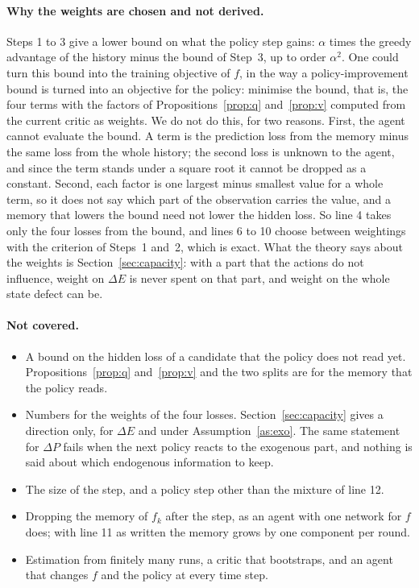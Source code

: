 \documentclass[11pt]{article}
\theoremstyle{definition}
\newcommand{\dE}{\Delta E}
\newcommand{\dP}{\Delta P}
\begin{document}
\paragraph{Why the weights are chosen and not derived.} Steps 1 to 3 give a lower bound on what the policy step gains: $\alpha$ times the greedy advantage of the history minus the bound of Step~3, up to order $\alpha^2$. One could turn this bound into the training objective of $f$, in the way a policy-improvement bound is turned into an objective for the policy: minimise the bound, that is, the four terms with the factors of Propositions~\ref{prop:q} and~\ref{prop:v} computed from the current critic as weights. We do not do this, for two reasons. First, the agent cannot evaluate the bound. A term is the prediction loss from the memory minus the same loss from the whole history; the second loss is unknown to the agent, and since the term stands under a square root it cannot be dropped as a constant. Second, each factor is one largest minus smallest value for a whole term, so it does not say which part of the observation carries the value, and a memory that lowers the bound need not lower the hidden loss. So line 4 takes only the four losses from the bound, and lines 6 to 10 choose between weightings with the criterion of Steps~1 and~2, which is exact. What the theory says about the weights is Section~\ref{sec:capacity}: with a part that the actions do not influence, weight on $\dE$ is never spent on that part, and weight on the whole state defect can be.

\paragraph{Not covered.}
\begin{itemize}\setlength{\itemsep}{0pt}
\item A bound on the hidden loss of a candidate that the policy does not read yet. Propositions~\ref{prop:q} and~\ref{prop:v} and the two splits are for the memory that the policy reads.
\item Numbers for the weights of the four losses. Section~\ref{sec:capacity} gives a direction only, for $\dE$ and under Assumption~\ref{as:exo}. The same statement for $\dP$ fails when the next policy reacts to the exogenous part, and nothing is said about which endogenous information to keep.
\item The size of the step, and a policy step other than the mixture of line 12.
\item Dropping the memory of $f_k$ after the step, as an agent with one network for $f$ does; with line 11 as written the memory grows by one component per round.
\item Estimation from finitely many runs, a critic that bootstraps, and an agent that changes $f$ and the policy at every time step.
\end{itemize}
\end{document}
